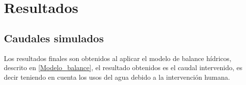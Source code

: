 \chapter{Resultados}
\label{capitulo 3}
\section{Caudales simulados}

Los resultados finales son obtenidos al aplicar el modelo de balance hídricos, descrito en  \ref{Modelo_balance}, el resultado 
obtenidos es el caudal intervenido, es decir teniendo en cuenta los usos del agua debido a la intervención humana.

